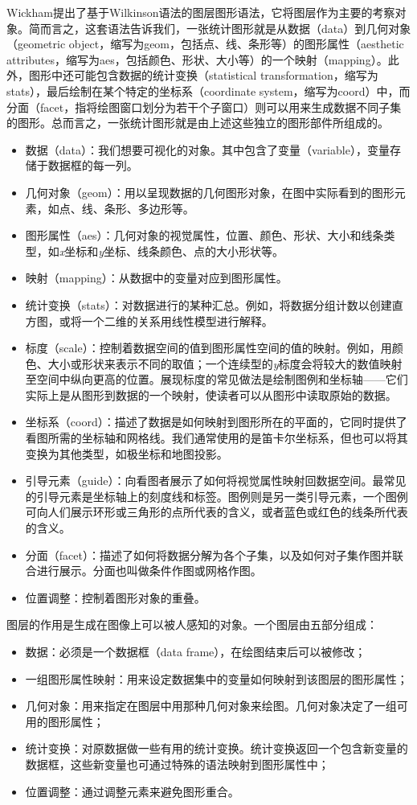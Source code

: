 \documentclass[11pt,a4paper,twoside]{book}
\begin{document}
Wickham提出了基于Wilkinson语法的图层图形语法，它将图层作为主要的考察对象。简而言之，这套语法告诉我们，一张统计图形就是从数据（data）到几何对象（geometric object，缩写为geom，包括点、线、条形等）的图形属性（aesthetic attributes，缩写为aes，包括颜色、形状、大小等）的一个映射（mapping）。此外，图形中还可能包含数据的统计变换（statistical transformation，缩写为stats），最后绘制在某个特定的坐标系（coordinate system，缩写为coord）中，而分面（facet，指将绘图窗口划分为若干个子窗口）则可以用来生成数据不同子集的图形。总而言之，一张统计图形就是由上述这些独立的图形部件所组成的。

\begin{itemize}
  \item 数据（data）：我们想要可视化的对象。其中包含了变量（variable），变量存储于数据框的每一列。
  \item 几何对象（geom）：用以呈现数据的几何图形对象，在图中实际看到的图形元素，如点、线、条形、多边形等。
  \item 图形属性（aes）：几何对象的视觉属性，位置、颜色、形状、大小和线条类型，如\textit{x}坐标和\textit{y}坐标、线条颜色、点的大小形状等。
  \item 映射（mapping）：从数据中的变量对应到图形属性。
  \item 统计变换（stats）：对数据进行的某种汇总。例如，将数据分组计数以创建直方图，或将一个二维的关系用线性模型进行解释。
  \item 标度（scale）：控制着数据空间的值到图形属性空间的值的映射。例如，用颜色、大小或形状来表示不同的取值；一个连续型的\textit{y}标度会将较大的数值映射至空间中纵向更高的位置。展现标度的常见做法是绘制图例和坐标轴——它们实际上是从图形到数据的一个映射，使读者可以从图形中读取原始的数据。
  \item 坐标系（coord）：描述了数据是如何映射到图形所在的平面的，它同时提供了看图所需的坐标轴和网格线。我们通常使用的是笛卡尔坐标系，但也可以将其变换为其他类型，如极坐标和地图投影。
  \item 引导元素（guide）：向看图者展示了如何将视觉属性映射回数据空间。最常见的引导元素是坐标轴上的刻度线和标签。图例则是另一类引导元素，一个图例可向人们展示环形或三角形的点所代表的含义，或者蓝色或红色的线条所代表的含义。
  \item 分面（facet）：描述了如何将数据分解为各个子集，以及如何对子集作图并联合进行展示。分面也叫做条件作图或网格作图。
  \item 位置调整：控制着图形对象的重叠。
\end{itemize}

图层的作用是生成在图像上可以被人感知的对象。一个图层由五部分组成：
\begin{itemize}
  \item 数据：必须是一个数据框（data frame），在绘图结束后可以被修改；
  \item 一组图形属性映射：用来设定数据集中的变量如何映射到该图层的图形属性；
  \item 几何对象：用来指定在图层中用那种几何对象来绘图。几何对象决定了一组可用的图形属性；
  \item 统计变换：对原数据做一些有用的统计变换。统计变换返回一个包含新变量的数据框，这些新变量也可通过特殊的语法映射到图形属性中；
  \item 位置调整：通过调整元素来避免图形重合。
\end{itemize}
\end{document}
